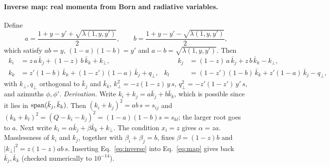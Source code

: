 \documentclass[11pt,a4paper]{article}
\newcommand{\jb}{\bar k_{j}}
\newcommand{\kb}{\bar k_{k}}
\begin{document}
\paragraph{Inverse map: real momenta from Born and radiative variables.} Define
\begin{equation}
a=\frac{1+y-y'+\sqrt{\lambda(1,y,y')}}{2},\qquad b=\frac{1+y-y'-\sqrt{\lambda(1,y,y')}}{2},
\end{equation}
which satisfy $ab=y$, $(1-a)(1-b)=y'$ and $a-b=\sqrt{\lambda(1,y,y')}$.
Then
\begin{equation}
\boxed{\;
\begin{aligned}
k_i&=z\,a\,\jb+(1-z)\,b\,\kb+k_\perp, &\qquad k_j&=(1-z)\,a\,\jb+z\,b\,\kb-k_\perp,\\
k_k&=z'(1-b)\,\kb+(1-z')(1-a)\,\jb+q_\perp, & k_l&=(1-z')(1-b)\,\kb+z'(1-a)\,\jb-q_\perp,
\end{aligned}\;}
\label{eq:inverse}
\end{equation}
with $k_\perp,q_\perp$ orthogonal to $\jb$ and $\kb$, $k_\perp^2=-z(1-z)\,y\,s$, $q_\perp^2=-z'(1-z')\,y'\,s$, and azimuths $\phi,\phi'$.
\textit{Derivation.} Write $k_i+k_j=a\jb+b\kb$, which is possible since it lies in ${\rm span}(\jb,\kb)$. Then
$(k_i+k_j)^2=ab\,s=s_{ij}$ and $(k_k+k_l)^2=(Q-k_i-k_j)^2=(1-a)(1-b)s=s_{kl}$; the larger root goes to $a$.
Next write $k_i=\alpha\jb+\beta\kb+k_\perp$. The condition $x_i=z$ gives $\alpha=za$. Masslessness of $k_i$ and $k_j$, together with $\beta_i+\beta_j=b$,
fixes $\beta=(1-z)b$ and $|k_\perp|^2=z(1-z)ab\,s$. Inserting Eq.~\eqref{eq:inverse} into Eq.~\eqref{eq:map} gives back $\jb,\kb$ (checked numerically to $10^{-14}$).
\end{document}

